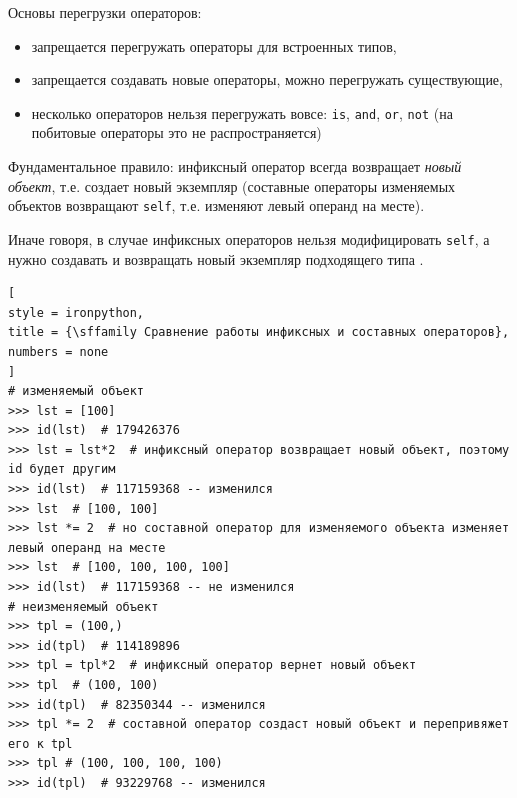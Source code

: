 \documentclass[%
	11pt,
	a4paper,
	utf8,
		]{article}
\begin{document}
Основы перегрузки операторов:

\begin{itemize}
	\item запрещается перегружать операторы для встроенных типов,
	
	\item запрещается создавать новые операторы, можно перегружать существующие,
	
	\item несколько операторов нельзя перегружать вовсе: \texttt{is}, \texttt{and}, \texttt{or}, \texttt{not} (на побитовые операторы это не распространяется)
\end{itemize}

Фундаментальное правило: инфиксный оператор всегда возвращает \emph{новый объект}, т.е. создает новый экземпляр (составные операторы изменяемых объектов возвращают \texttt{self}, т.е. изменяют левый операнд на месте).

Иначе говоря, в случае инфиксных операторов нельзя модифицировать \texttt{self}, а нужно создавать и возвращать новый экземпляр подходящего типа \cite[]{ramalho:python-2016}.


\begin{lstlisting}[
style = ironpython,
title = {\sffamily Сравнение работы инфиксных и составных операторов},
numbers = none
]
# изменяемый объект
>>> lst = [100]  
>>> id(lst)  # 179426376
>>> lst = lst*2  # инфиксный оператор возвращает новый объект, поэтому id будет другим
>>> id(lst)  # 117159368 -- изменился
>>> lst  # [100, 100]
>>> lst *= 2  # но составной оператор для изменяемого объекта изменяет левый операнд на месте
>>> lst  # [100, 100, 100, 100]
>>> id(lst)  # 117159368 -- не изменился
# неизменяемый объект
>>> tpl = (100,)
>>> id(tpl)  # 114189896
>>> tpl = tpl*2  # инфиксный оператор вернет новый объект
>>> tpl  # (100, 100)
>>> id(tpl)  # 82350344 -- изменился
>>> tpl *= 2  # составной оператор создаст новый объект и перепривяжет его к tpl
>>> tpl # (100, 100, 100, 100)
>>> id(tpl)  # 93229768 -- изменился
\end{lstlisting}
\end{document}
